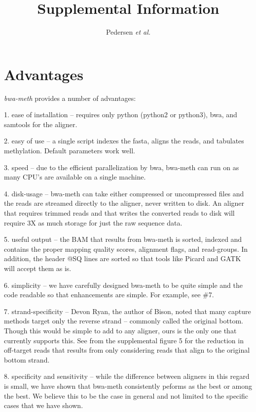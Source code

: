 \documentclass[12pt]{article}
\title{Supplemental Information}
\author{Pedersen \textit{et al.}}
\date{}
\begin{document}
\maketitle

\section{Advantages}
\textit{bwa-meth} provides a number of advantages:

1. ease of installation -- requires only python (python2 or python3), bwa,
   and samtools for the aligner.

2. easy of use -- a single script indexes the fasta, aligns the reads, and
   tabulates methylation. Default parameters work well.

3. speed -- due to the efficient parallelization by bwa, bwa-meth can run on
   as many CPU's are available on a single machine.

4. disk-usage -- bwa-meth can take either compressed or uncompressed files
   and the reads are streamed directly to the aligner, never written to disk. An
   aligner that requires trimmed reads and that writes the converted reads to
   disk will require 3X as much storage for just the raw sequence data.

5. useful output -- the BAM that results from bwa-meth is sorted, indexed and
   contains the proper mapping quality scores, alignment flags, and read-groups.
   In addition, the header @SQ lines are sorted so that tools like Picard and
   GATK will accept them as is.

6. simplicity -- we have carefully designed bwa-meth to be quite simple and
   the code readable so that enhancements are simple. For example, see \#7.

7. strand-specificity -- Devon Ryan,
   the author of Bison, noted that many capture methods target only the reverse
   strand -- commonly called the original bottom. Though this would be simple to
   add to any aligner, ours is the only one that currently supports this. See
   from the supplemental figure 5 for the reduction in off-target reads that results
   from only considering reads that align to the original bottom strand.

8. specificity and sensitivity -- while the difference between aligners in
   this regard is small, we have shown that bwa-meth consistently peforms as the
   best or among the best. We believe this to be the case in general and not
   limited to the specific cases that we have shown.
\end{document}
